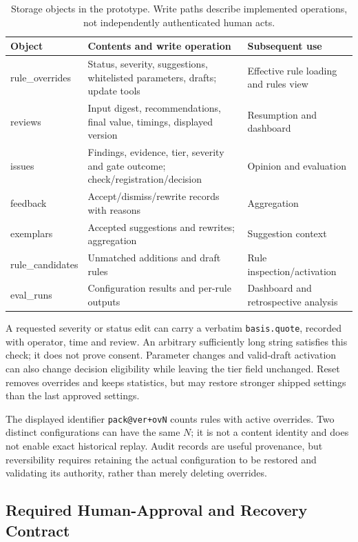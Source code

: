 \begin{table}[!ht]
\caption{Storage objects in the prototype. Write paths describe implemented operations, not independently authenticated human acts.}
\label{tab:storage}
\centering\footnotesize
\begin{tabularx}{\textwidth}{@{}p{3cm}XX@{}}
\toprule
Object & Contents and write operation & Subsequent use \\
\midrule
rule\_overrides & Status, severity, suggestions, whitelisted parameters, drafts; update tools & Effective rule loading and rules view \\
reviews & Input digest, recommendations, final value, timings, displayed version & Resumption and dashboard \\
issues & Findings, evidence, tier, severity and gate outcome; check/registration/decision & Opinion and evaluation \\
feedback & Accept/dismiss/rewrite records with reasons & Aggregation \\
exemplars & Accepted suggestions and rewrites; aggregation & Suggestion context \\
rule\_candidates & Unmatched additions and draft rules & Rule inspection/activation \\
eval\_runs & Configuration results and per-rule outputs & Dashboard and retrospective analysis \\
\bottomrule
\end{tabularx}
\end{table}

A requested severity or status edit can carry a verbatim \texttt{basis.quote}, recorded with operator, time and review. An arbitrary sufficiently long string satisfies this check; it does not prove consent. Parameter changes and valid-draft activation can also change decision eligibility while leaving the tier field unchanged. Reset removes overrides and keeps statistics, but may restore stronger shipped settings than the last approved settings.

The displayed identifier \texttt{pack@ver+ovN} counts rules with active overrides. Two distinct configurations can have the same $N$; it is not a content identity and does not enable exact historical replay. Audit records are useful provenance, but reversibility requires retaining the actual configuration to be restored and validating its authority, rather than merely deleting overrides.

\subsection{Required Human-Approval and Recovery Contract}\label{sec:contract}

